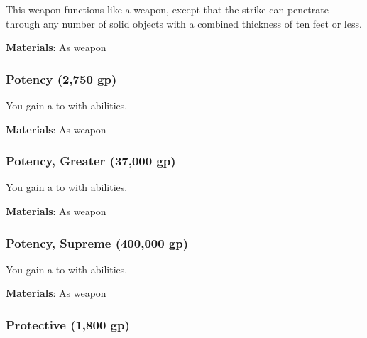 This weapon functions like a  weapon, except that the strike can penetrate through any number of solid objects with a combined thickness of ten feet or less.



\vspace{0.25em}
\textbf{Materials}: As weapon


\lowercase{\hypertarget{item:Potency}{}}\label{item:Potency}
\hypertarget{item:Potency}{\subsubsection{Potency\hfill{} (2,750 gp)}}

You gain a   to  with  abilities.



\vspace{0.25em}
\textbf{Materials}: As weapon


\lowercase{\hypertarget{item:Potency, Greater}{}}\label{item:Potency, Greater}
\hypertarget{item:Potency, Greater}{\subsubsection{Potency, Greater\hfill{} (37,000 gp)}}

You gain a   to  with  abilities.



\vspace{0.25em}
\textbf{Materials}: As weapon


\lowercase{\hypertarget{item:Potency, Supreme}{}}\label{item:Potency, Supreme}
\hypertarget{item:Potency, Supreme}{\subsubsection{Potency, Supreme\hfill{} (400,000 gp)}}

You gain a   to  with  abilities.



\vspace{0.25em}
\textbf{Materials}: As weapon


\lowercase{\hypertarget{item:Protective}{}}\label{item:Protective}
\hypertarget{item:Protective}{\subsubsection{Protective\hfill{} (1,800 gp)}}

